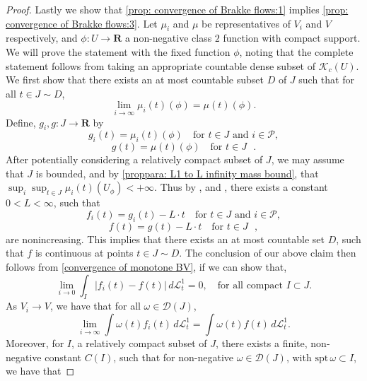 \documentclass{article}
\theoremstyle{plain}
\theoremstyle{definition}
\theoremstyle{plain}
\theoremstyle{remark}
\theoremstyle{remark}
\theoremstyle{plain}
\begin{document}
\begin{proof}
    Lastly we show that \ref{prop: convergence of Brakke flows:1} implies \ref{prop: convergence of Brakke flows:3}.
    Let $\mu_i$ and $\mu$ be representatives of $V_i$ and $V$ respectively, and $\phi : U \to \mathbf R$ a non-negative class $2$ function with compact support.
    We will prove the statement with the fixed function $\phi$, noting that the complete statement follows from taking an appropriate countable dense subset of $\mathscr{K}_{c} (U)$.
    We first show that there exists an at most countable subset $D$ of $J$ such that for all $t \in J \sim D$, 
    \begin{equation*}
        \textstyle \lim_{i \rightarrow \infty} \mu_{i} (t) (\phi) = \mu (t) (\phi).
    \end{equation*}
    Define, $g_i,g : J \to \mathbf R$ by 
    \[ g_i(t) = \mu_i(t)(\phi) \quad \text{for $t\in J$ and $i\in\mathscr P$},\]
    \[ g(t) = \mu(t)(\phi) \quad \text{for $t\in J$ }.\]
    After potentially considering a relatively compact subset of $J$, we may assume that $J$ is bounded, and by \ref{proppara: L1 to L infinity mass bound}, that $\sup_{i} \sup_{t \in J} \mu_{i} (t)(U_{\phi}) < + \infty$. 
    Thus by \cite[3.10.2]{LW-Space-Time-GrassmannMeasureBrakkeFlow}, and \cite[A.2]{Lahiri2017EqualityOT}, there exists a constant $0<L<\infty$, such that 
    \[ f_i(t) = g_i(t) - L \cdot t \quad \text{for $t\in J$ and $i\in\mathscr P$},\]
    \[ f(t) = g(t) - L \cdot t \quad \text{for $t\in J$ },\]
    are nonincreasing.
    This implies that there exists an at most countable set $D$, such that $f$ is continuous at points $t \in J \sim D$.
    The conclusion of our above claim then follows from \ref{convergence of monotone BV}, if we can show that, 
    \begin{equation}\label{eq:L_1 convergence}
        \textstyle \lim\limits_{i \rightarrow 0} \int_{I} |f_{i} (t) - f(t)| \, d \mathscr{L}^{1}_{t} = 0, \quad \text{for all compact $I \subset J$.}
    \end{equation}
    As $V_{i} \rightarrow V$, we have that for all $\omega \in \mathscr{D} (J)$,
    \begin{equation}\label{eq:weak convergece of f_i}
        \textstyle \lim\limits_{i \rightarrow \infty} \int \omega (t) f_{i} (t) \, d \mathscr{L}^{1}_{t} = \int \omega (t) f (t) \, d \mathscr{L}^{1}_{t}.
    \end{equation}
    Moreover, for $I$, a relatively compact subset of $J$, there exists a finite, non-negative constant $C (I)$, such that for non-negative $\omega \in \mathscr{D} (J)$, with $\mathrm{spt} \, \omega \subset I$,  we have that

\end{proof}
\end{document}
